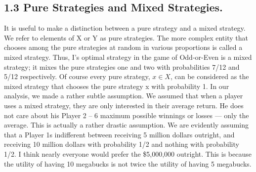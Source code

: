 \documentclass[]{report}
\begin{document}
\subsection{1.3 Pure Strategies and Mixed Strategies.} It is useful to make a distinction
between a pure strategy and a mixed strategy. We refer to elements of X or Y as pure
strategies. The more complex entity that chooses among the pure strategies at random in
various proportions is called a mixed strategy. Thus, I’s optimal strategy in the game of
Odd-or-Even is a mixed strategy; it mixes the pure strategies one and two with probabilities
7/12 and 5/12 respectively. Of course every pure strategy, $x \in X$, can be considered as
the mixed strategy that chooses the pure strategy x with probability 1.
In our analysis, we made a rather subtle assumption. We assumed that when a player
uses a mixed strategy, they are only interested in their average return. He does not care about his
Player 2 – 6
maximum possible winnings or losses — only the average. This is actually a rather drastic
assumption. We are evidently assuming that a Player 1s indifferent between receiving 5
million dollars outright, and receiving 10 million dollars with probability 1/2 and nothing
with probability 1/2. I think nearly everyone would prefer the \$5,000,000 outright. This is
because the utility of having 10 megabucks is not twice the utility of having 5 megabucks.
\end{document}
